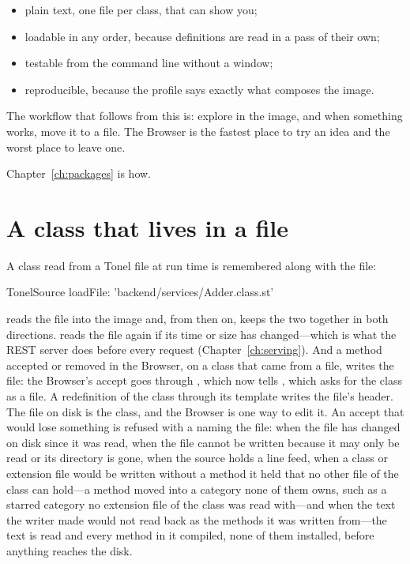 \begin{itemize}
\item plain text, one file per class, that  can show you;
\item loadable in any order, because definitions are read in a pass of their
  own;
\item testable from the command line without a window;
\item reproducible, because the profile says exactly what composes the image.
\end{itemize}

The workflow that follows from this is: explore in the image, and when
something works, move it to a file. The Browser is the fastest place to try an
idea and the worst place to leave one.

Chapter~\ref{ch:packages} is how.

\section{A class that lives in a file}

A class read from a Tonel file at run time is remembered along with the file:

\begin{st}
TonelSource loadFile: 'backend/services/Adder.class.st'
\end{st}

reads the file into the image and, from then on, keeps the two together in
both directions.  reads the file again
if its time or size has changed---which is what the REST server does before
every request (Chapter~\ref{ch:serving}). And a method accepted or removed in
the Browser, on a class that came from a file, writes the file: the Browser's
accept goes through , which now tells
, which asks  for the class as a file. A
redefinition of the class through its template writes the file's header. The
file on disk is the class, and the Browser is one way to edit it. An accept
that would lose something is refused with a  naming the file:
when the file has changed on disk since it was read, when the file cannot be
written because it may only be read or its directory is gone, when the source
holds a line feed, when a class or extension file would be written without a
method it held that no other file of the class can hold---a method moved into
a category none of them owns, such as a starred category no extension file of
the class was read with---and when the text the writer made would not
read back as the methods it was written from---the text is read and every
method in it compiled, none of them installed, before anything reaches the
disk.

